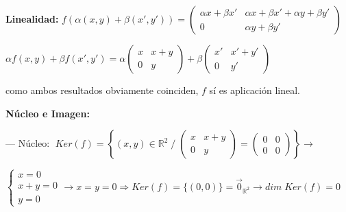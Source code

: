\begin{proofw}\renewcommand{\qedsymbol}{$\diamond$}
	
\noindent \textcolor{gris}{\textbf{Linealidad:}} $f(\alpha(x,y)+\beta(x',y'))=\left( \begin{matrix} \alpha x+\beta x'&\alpha x+\beta x'+ \alpha y+\beta y'\\0&\alpha y+\beta y' \end{matrix} \right)$

\noindent $\alpha f(x,y)+\beta f(x',y') = \alpha \left( \begin{matrix} x&x+y\\0&y \end{matrix} \right)+ \beta \left( \begin{matrix} x'&x'+y'\\0&y' \end{matrix} \right)$

\noindent como ambos resultados obviamente coinciden, $f$ sí es aplicación lineal.

\noindent \textcolor{gris}{\textbf{Núcleo e Imagen:}} 

\noindent --- Núcleo: $\; Ker(f)=\left\{(x,y)\in \mathbb R^2\; / \; \left( \begin{matrix} x&x+y\\0&y \end{matrix} \right)=\left( \begin{matrix} 0&0\\0&0 \end{matrix} \right) \right\} \to $

\noindent \small{$\begin{cases} x=0\\x+y=0\\y=0 \end{cases} \to x=y=0 \Rightarrow Ker (f)=\{(0,0)\}=\vec 0_{\mathbb R^2} \to dim\; Ker (f)=0$}


\end{proofw}
